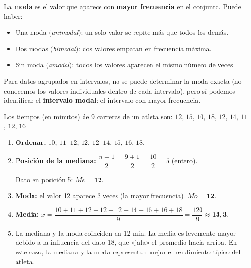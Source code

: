 \documentclass[11pt, letterpaper]{article}
\begin{document}
\begin{tcolorbox}[importantbox, title={Moda $Mo$}]
La \textbf{moda} es el valor que aparece con \textbf{mayor frecuencia} en el conjunto. Puede haber:
\begin{itemize}
  \item Una moda (\textit{unimodal}): un solo valor se repite más que todos los demás.
  \item Dos modas (\textit{bimodal}): dos valores empatan en frecuencia máxima.
  \item Sin moda (\textit{amodal}): todos los valores aparecen el mismo número de veces.
\end{itemize}

Para datos agrupados en intervalos, no se puede determinar la moda exacta (no conocemos los valores individuales dentro de cada intervalo), pero sí podemos identificar el \textbf{intervalo modal}: el intervalo con mayor frecuencia.
\end{tcolorbox}

\begin{tcolorbox}[examplebox, title={Ej. 8. Mediana y moda}]
Los tiempos (en minutos) de 9 carreras de un atleta son:
$12$, $15$, $10$, $18$, $12$, $14$, $11$, $12$, $16$

\begin{enumerate}[label=\textbf{\arabic*.}, leftmargin=2.8cm]
  \item[\textbf{Paso 1.}] \textbf{Ordenar:} $10$, $11$, $12$, $12$, $12$, $14$, $15$, $16$, $18$.

  \medskip
  \item[\textbf{Paso 2.}] \textbf{Posición de la mediana:} $\dfrac{n+1}{2} = \dfrac{9+1}{2} = \dfrac{10}{2} = 5$ (entero).

  Dato en posición 5: $Me = \mathbf{12}$.

  \medskip
  \item[\textbf{Paso 3.}] \textbf{Moda:} el valor 12 aparece 3 veces (la mayor frecuencia). $Mo = \mathbf{12}$.

  \medskip
  \item[\textbf{Paso 4.}] \textbf{Media:} $\bar{x} = \dfrac{10+11+12+12+12+14+15+16+18}{9} = \dfrac{120}{9} \approx \mathbf{13{,}3}$.

  \medskip
  \item[\textbf{Conclusión.}] La mediana y la moda coinciden en 12 min. La media es levemente mayor debido a la influencia del dato 18, que «jala» el promedio hacia arriba. En este caso, la mediana y la moda representan mejor el rendimiento típico del atleta.
\end{enumerate}
\end{tcolorbox}
\end{document}
